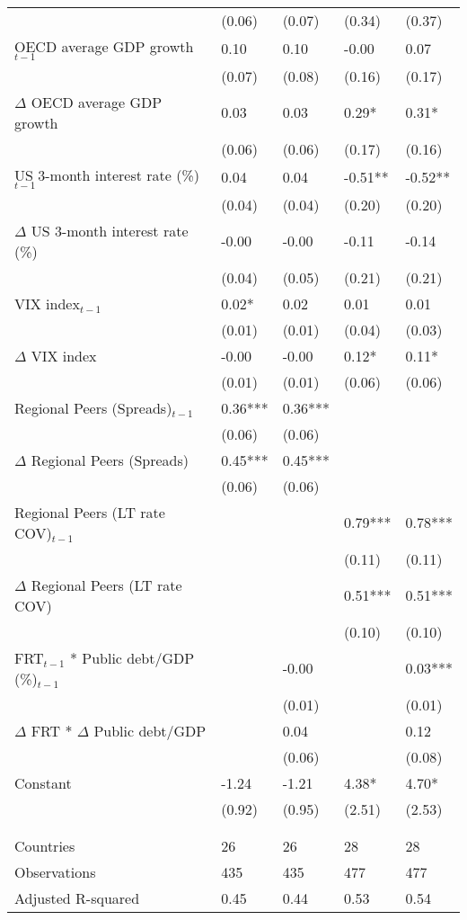 \begin{tabular}{lp{3cm}p{3cm}p{3cm}p{3cm}}
   & (0.06) & (0.07) & (0.34) & (0.37) \\ 
  OECD average GDP growth$_{t-1}$ & 0.10 & 0.10 & -0.00 & 0.07 \\ 
   & (0.07) & (0.08) & (0.16) & (0.17) \\ 
  $\Delta$ OECD average GDP growth & 0.03 & 0.03 & 0.29* & 0.31* \\ 
   & (0.06) & (0.06) & (0.17) & (0.16) \\ 
  US 3-month interest rate (\%)$_{t-1}$ & 0.04 & 0.04 & -0.51** & -0.52** \\ 
   & (0.04) & (0.04) & (0.20) & (0.20) \\ 
  $\Delta$ US 3-month interest rate (\%) & -0.00 & -0.00 & -0.11 & -0.14 \\ 
   & (0.04) & (0.05) & (0.21) & (0.21) \\ 
  VIX index$_{t-1}$ & 0.02* & 0.02 & 0.01 & 0.01 \\ 
   & (0.01) & (0.01) & (0.04) & (0.03) \\ 
  $\Delta$ VIX index & -0.00 & -0.00 & 0.12* & 0.11* \\ 
   & (0.01) & (0.01) & (0.06) & (0.06) \\ 
  Regional Peers (Spreads)$_{t-1}$ & 0.36*** & 0.36*** &  &  \\ 
   & (0.06) & (0.06) &  &  \\ 
  $\Delta$ Regional Peers (Spreads) & 0.45*** & 0.45*** &  &  \\ 
   & (0.06) & (0.06) &  &  \\ 
  Regional Peers (LT rate COV)$_{t-1}$ &  &  & 0.79*** & 0.78*** \\ 
   &  &  & (0.11) & (0.11) \\ 
  $\Delta$ Regional Peers (LT rate COV) &  &  & 0.51*** & 0.51*** \\ 
   &  &  & (0.10) & (0.10) \\ 
  FRT$_{t-1}$ * Public debt/GDP (\%)$_{t-1}$ &  & -0.00 &  & 0.03*** \\ 
   &  & (0.01) &  & (0.01) \\ 
  $\Delta$ FRT * $\Delta$ Public debt/GDP &  & 0.04 &  & 0.12 \\ 
   &  & (0.06) &  & (0.08) \\ 
  Constant & -1.24 & -1.21 & 4.38* & 4.70* \\ 
   & (0.92) & (0.95) & (2.51) & (2.53) \\ 
   &  &  &  &  \\ 
   &  &  &  &  \\ 
  Countries & 26 & 26 & 28 & 28 \\ 
  Observations & 435 & 435 & 477 & 477 \\ 
  Adjusted R-squared & 0.45 & 0.44 & 0.53 & 0.54 \\ 
   \hline
\end{tabular}
\endgroup
